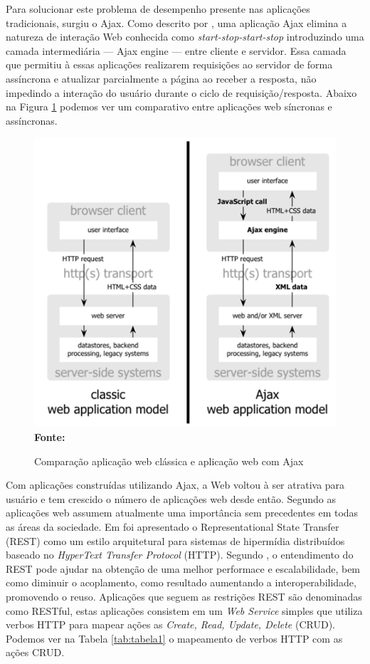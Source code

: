 Para solucionar este problema de desempenho presente nas aplicações tradicionais, surgiu o Ajax. Como descrito por \cite{garrettAjax}, uma aplicação
Ajax elimina a natureza de interação Web conhecida como \textit{start-stop-start-stop} introduzindo uma camada intermediária — Ajax engine — entre 
cliente e servidor. Essa camada que permitiu à essas aplicações realizarem requisições ao servidor de forma assíncrona e atualizar parcialmente a 
página ao receber a resposta, não impedindo a interação do usuário durante o ciclo de requisição/resposta. Abaixo na Figura \ref{fig:ajax_comparison} 
podemos ver um comparativo entre aplicações web síncronas e assíncronas.

\begin{figure}[!ht]
	\centering	
	\caption[\hspace{0.1cm}Comparação aplicação web clássica e aplicação web com Ajax.]{Comparação aplicação web clássica e aplicação web com Ajax}
	  \vspace{-0.4cm}
	\includegraphics[width=.8\textwidth]{figuras/ajax_comparison.png}
	 \vspace{-0.3cm}
	\\\textbf{\footnotesize Fonte: \cite{garrettAjax}}
	\label{fig:ajax_comparison}
\end{figure}


Com aplicações construídas utilizando Ajax, a Web voltou à ser atrativa para usuário e tem crescido o número de aplicações web desde então. Segundo
\cite{tabulaRest} as aplicações web assumem atualmente uma importância sem precedentes em todas as áreas da sociedade. Em \cite{fieldingRest} foi apresentado o Representational State Transfer (REST) 
como um estilo arquitetural para sistemas de hipermídia distribuídos baseado no \textit{HyperText Transfer Protocol} (HTTP). Segundo 
\cite{modelingRestful}, o entendimento do REST pode ajudar na obtenção de uma melhor performace e escalabilidade, bem como diminuir o acoplamento,
como resultado aumentando a interoperabilidade, promovendo o reuso. Aplicações que seguem as restrições REST são denominadas como RESTful, estas 
aplicações consistem em um \textit{Web Service} simples que utiliza verbos HTTP para mapear ações as \textit{Create, Read, Update, Delete} (CRUD). 
Podemos ver na Tabela \ref{tab:tabela1} o mapeamento de verbos HTTP com as ações CRUD.

